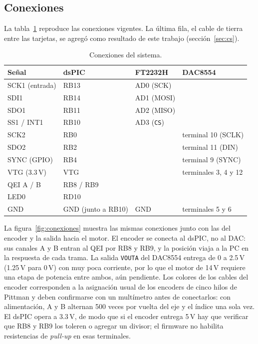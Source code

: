 \documentclass[11pt]{article}
\newcommand{\code}[1]{\texttt{#1}}
\begin{document}
\subsection{Conexiones}

La tabla~\ref{tab:conexiones} reproduce las conexiones vigentes. La última
fila, el cable de tierra entre las tarjetas, se agregó como resultado de este
trabajo (sección~\ref{sec:cs}).

\begin{table}[H]
\centering
\small
\begin{tabular}{@{}llll@{}}
\toprule
Señal & dsPIC & FT2232H & DAC8554 \\
\midrule
SCK1 (entrada) & RB13 & AD0 (SCK) & \\
SDI1 & RB14 & AD1 (MOSI) & \\
SDO1 & RB11 & AD2 (MISO) & \\
SS1 / INT1 & RB10 & AD3 (\code{CS}) & \\
SCK2 & RB0 & & terminal 10 (SCLK) \\
SDO2 & RB2 & & terminal 11 (DIN) \\
SYNC (GPIO) & RB4 & & terminal 9 (SYNC) \\
VTG (3.3\,V) & VTG & & terminales 3, 4 y 12 \\
QEI A / B & RB8 / RB9 & & \\
LED0 & RD10 & & \\
GND & GND (junto a RB10) & GND & terminales 5 y 6 \\
\bottomrule
\end{tabular}
\caption{Conexiones del sistema.}
\label{tab:conexiones}
\end{table}

La figura~\ref{fig:conexiones} muestra las mismas conexiones junto con las
del encoder y la salida hacia el motor. El encoder se conecta al dsPIC, no al
DAC: sus canales A y B entran al QEI por RB8 y RB9, y la posición viaja a la
PC en la respuesta de cada trama. La salida \code{VOUTA} del DAC8554 entrega
de 0 a 2.5\,V (1.25\,V para 0\,V) con muy poca corriente, por lo que el motor de 14\,V requiere una
etapa de potencia entre ambos, aún pendiente. Los colores de los cables del
encoder corresponden a la asignación usual de los encoders de cinco hilos de
Pittman y deben confirmarse con un multímetro antes de conectarlos: con
alimentación, A y B alternan 500 veces por vuelta del eje y el índice una sola
vez. El dsPIC opera a 3.3\,V, de modo que si el encoder entrega 5\,V hay que
verificar que RB8 y RB9 los toleren o agregar un divisor; el firmware no
habilita resistencias de \emph{pull-up} en esas terminales.
\end{document}
